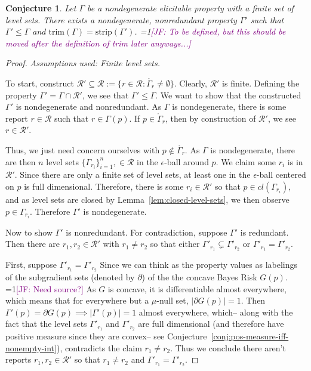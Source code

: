 \documentclass[12pt]{article}
\newcommand{\Comments}{1}
\newcommand{\mynote}[2]{\ifnum\Comments=1\textcolor{#1}{#2}\fi}
\newcommand{\jessie}[1]{\mynote{purple}{[JF: #1]}}
\newcommand{\R}{\mathcal{R}}
\newcommand{\inter}[1]{\mathring{#1}}%
\newcommand{\trim}{\mathrm{trim}}
\newcommand{\strip}{\text{strip}}
\newtheorem{conjecture}{Conjecture}
\begin{document}
\begin{conjecture}\label{conj:gam-prime-exists}
	Let $\Gamma$ be a nondegenerate elicitable property with a finite set of level sets.
	There exists a nondegenerate, nonredundant property $\Gamma'$ such that $\Gamma' \leq \Gamma$ and $\trim(\Gamma) = \strip(\Gamma')$. \jessie{To be defined, but this should be moved after the definition of trim later anyways...} 
\end{conjecture}
\begin{proof}
\emph{Assumptions used: Finite level sets.}

	To start, construct $\R' \subseteq \R := \{ r \in \R : \inter{\Gamma_r} \neq \emptyset \}$.
	Clearly, $\R'$ is finite.
	Defining the property $\Gamma' = \Gamma\cap \R'$, we see that $\Gamma' \leq \Gamma$.
	We want to show that the constructed $\Gamma'$ is nondegenerate and nonredundant.
	As $\Gamma$ is nondegenerate, there is some report $r \in \R$ such that $r \in \Gamma(p)$.
	If $p \in \inter{\Gamma}_r$, then by construction of $\R'$, we see $r \in \R'$.
	
	Thus, we just need concern ourselves with $p \not \in \inter{\Gamma_r}$.
	As $\Gamma$ is nondegenerate, there are then $n$ level sets $\{\Gamma_{r_i}\}_{i=1}^n, \in \R$ in the $\epsilon$-ball around $p$.
	We claim some $r_i$ is in $\R'$.
	Since there are only a finite set of level sets, at least one in the $\epsilon$-ball centered on $p$ is full dimensional.
	Therefore, there is some $r_i \in \R'$ so that $p \in cl(\Gamma_{r_i})$, and as level sets are closed by Lemma~\ref{lem:closed-level-sets}, we then observe $p \in \Gamma_{r_i}$.
	Therefore $\Gamma'$ is nondegenerate.
	
	Now to show $\Gamma'$ is nonredundant.
	For contradiction, suppose $\Gamma'$ is redundant.
	Then there are $r_1, r_2 \in \R'$ with $r_1 \neq r_2$ so that either $\Gamma'_{r_1} \subsetneq \Gamma'_{r_2}$ or $\Gamma'_{r_1} = \Gamma'_{r_2}$.
	
	First, suppose $\Gamma'_{r_1} = \Gamma'_{r_2}$
	Since we can think as the property values as labelings of the subgradient sets (denoted by $\partial$) of the the concave Bayes Risk $G(p)$.
	\jessie{Need source?}
	As $G$ is concave, it is differentiable almost everywhere, which means that for everywhere but a $\mu$-null set, $|\partial G(p)| = 1$.
	Then $\Gamma'(p) = \partial G(p) \implies |\Gamma'(p)| = 1$ almost everywhere, which-- along with the fact that the level sets $\Gamma'_{r_1}$ and $\Gamma'_{r_2}$ are full dimensional (and therefore have positive measure since they are convex-- see Conjecture~\ref{conj:pos-measure-iff-nonempty-int}), contradicts the claim $r_1 \neq r_2$.
	Thus we conclude there aren't reports $r_1, r_2 \in \R'$ so that $r_1 \neq r_2$ and $\Gamma'_{r_1} = \Gamma'_{r_2}$.
	

\end{proof}
\end{document}
